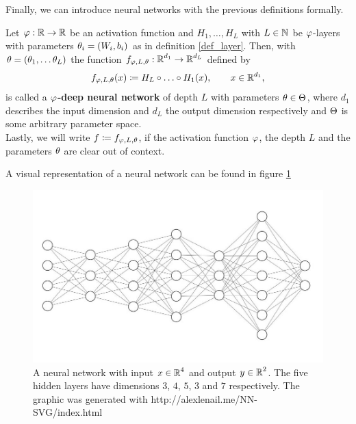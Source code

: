 Finally, we can introduce neural networks with the previous definitions formally.


\begin{definition}
Let $\operatorname{\varphi}: \operatorname{\mathbb{R}} \to \operatorname{\mathbb{R}}$ be an activation function and $H_1, \ldots, H_L$ with $L \in \operatorname{\mathbb{N}}$ be $\operatorname{\varphi}$-layers with parameters $\theta_i = (W_i, b_i)$ as in definition \ref{def_layer}. Then, with $\theta = (\theta_1, \ldots \theta_L)$ the function $f_{\operatorname{\varphi}, L, \theta}: \operatorname{\mathbb{R}}^{d_1} \to \operatorname{\mathbb{R}}^{d_L}$ defined by
\begin{align}
f_{\operatorname{\varphi}, L, \theta} (x) \coloneqq H_L \circ \ldots \circ H_1 (x), \qquad x \in \operatorname{\mathbb{R}}^{d_1},
\end{align}
is called a \textbf{$\operatorname{\varphi}$-deep neural network} of depth $L$ with parameters $\theta \in \operatorname{\Theta}$, where $d_1$ describes the input dimension and $d_L$ the output dimension respectively and $\operatorname{\Theta}$ is some arbitrary parameter space.\\
Lastly, we will write $f\coloneqq f_{\operatorname{\varphi}, L, \theta}$, if the activation function $\operatorname{\varphi}$, the depth $L$ and the parameters $\theta$ are clear out of context.
\end{definition}


A visual representation of a neural network can be found in figure \ref{img_nn}


\begin{figure}[H]
\begin{center}
   \begin{minipage}[b]{0.9\linewidth}
      \includegraphics[width=\linewidth]{neural_net}
      \caption{A neural network with input $x\in \operatorname{\mathbb{R}}^4$ and output $y\in\operatorname{\mathbb{R}}^2$. The five hidden layers have dimensions $3$, $4$, $5$, $3$ and $7$ respectively. The graphic was generated with http://alexlenail.me/NN-SVG/index.html}\label{img_nn}
	\end{minipage}
\end{center}
\end{figure}


